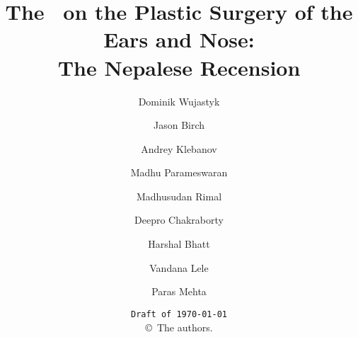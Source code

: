 \documentclass[12pt,draft]{article} %
\title{The \SS\ on the Plastic Surgery of the Ears and Nose:\\ The Nepalese 
Recension}
\author{Dominik Wujastyk \and
Jason Birch \and
Andrey Klebanov \and  
Madhu Parameswaran \and 
Madhusudan Rimal \and  
Deepro Chakraborty \and 
Harshal Bhatt \and  
Vandana Lele \and
Paras Mehta}
\date{\texttt{Draft of \today}\\ \copyright\     The authors.}
\begin{document}
    
    
    \maketitle
 
%     
\tableofcontents

\newpage

     
     
     
    
     
     

%    

\newpage    
\listoftodos
    
\end{document}
